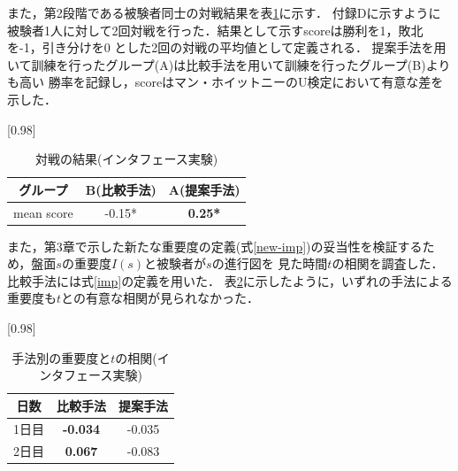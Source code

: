 \begin{table}[H]
    \caption{先読み手数制限なしの場合(インタフェース実験)}
    \scriptsize
    \centering
    \label{table:system-100}
\end{table}
また，第2段階である被験者同士の対戦結果を表\ref{table:result-battle}に示す．
付録Dに示すように被験者1人に対して2回対戦を行った．結果として示すscoreは勝利を1，敗北を-1，引き分けを0
とした2回の対戦の平均値として定義される．
提案手法を用いて訓練を行ったグループ(A)は比較手法を用いて訓練を行ったグループ(B)よりも高い
勝率を記録し，scoreはマン・ホイットニーのU検定において有意な差を示した．
\begin{table}[H]
	\caption{対戦の結果(インタフェース実験)}
    \label{table:result-battle}
	\centering
	\scalebox{0.98}[0.98]{
		\begin{tabular}{c|c|c}
            グループ & B(比較手法)  & A(提案手法) \\ \hline
			mean score &  -0.15*   & \bf{0.25*}\\ \hline
		\end{tabular}
	}
	
\end{table}
また，第3章で示した新たな重要度の定義(式\ref{new-imp})の妥当性を検証するため，盤面$s$の重要度$I(s)$と被験者が$s$の進行図を
見た時間$t$の相関を調査した．比較手法には式\ref{imp}の定義を用いた．
表\ref{table:result-imp}に示したように，いずれの手法による重要度も$t$との有意な相関が見られなかった．
\begin{table}[H]
	\caption{手法別の重要度と$t$の相関(インタフェース実験)}
    \label{table:result-imp}
	\centering
	\scalebox{0.98}[0.98]{
		\begin{tabular}{c|c|c}
			日数& 比較手法& 提案手法  \\ \hline
			1日目& \bf{-0.034}& {-0.035}\\
            2日目& \bf{0.067}& {-0.083}\\
		\end{tabular}
	}
	
\end{table}


